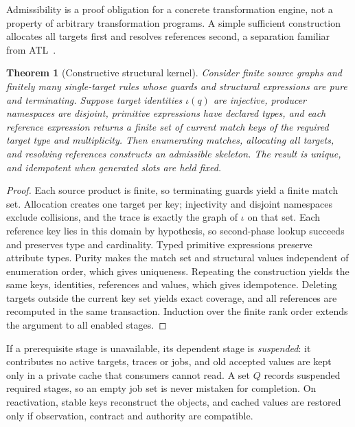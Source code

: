 \documentclass[10pt,journal,compsoc]{IEEEtran}
\theoremstyle{plain}
\newtheorem{theorem}{Theorem}
\theoremstyle{definition}
\begin{document}
Admissibility is a proof obligation for a concrete transformation engine, not a property of arbitrary transformation programs. A simple sufficient construction allocates all targets first and resolves references second, a separation familiar from ATL~\cite{atl}.

\begin{theorem}[Constructive structural kernel]\label{thm:kernel}
Consider finite source graphs and finitely many single-target rules whose guards and structural expressions are pure and terminating. Suppose target identities $\iota(q)$ are injective, producer namespaces are disjoint, primitive expressions have declared types, and each reference expression returns a finite set of current match keys of the required target type and multiplicity. Then enumerating matches, allocating all targets, and resolving references constructs an admissible skeleton. The result is unique, and idempotent when generated slots are held fixed.
\end{theorem}
\begin{proof}
Each source product is finite, so terminating guards yield a finite match set. Allocation creates one target per key; injectivity and disjoint namespaces exclude collisions, and the trace is exactly the graph of $\iota$ on that set. Each reference key lies in this domain by hypothesis, so second-phase lookup succeeds and preserves type and cardinality. Typed primitive expressions preserve attribute types. Purity makes the match set and structural values independent of enumeration order, which gives uniqueness. Repeating the construction yields the same keys, identities, references and values, which gives idempotence. Deleting targets outside the current key set yields exact coverage, and all references are recomputed in the same transaction. Induction over the finite rank order extends the argument to all enabled stages.
\end{proof}

If a prerequisite stage is unavailable, its dependent stage is \emph{suspended}: it contributes no active targets, traces or jobs, and old accepted values are kept only in a private cache that consumers cannot read. A set $Q$ records suspended required stages, so an empty job set is never mistaken for completion. On reactivation, stable keys reconstruct the objects, and cached values are restored only if observation, contract and authority are compatible.
\end{document}
